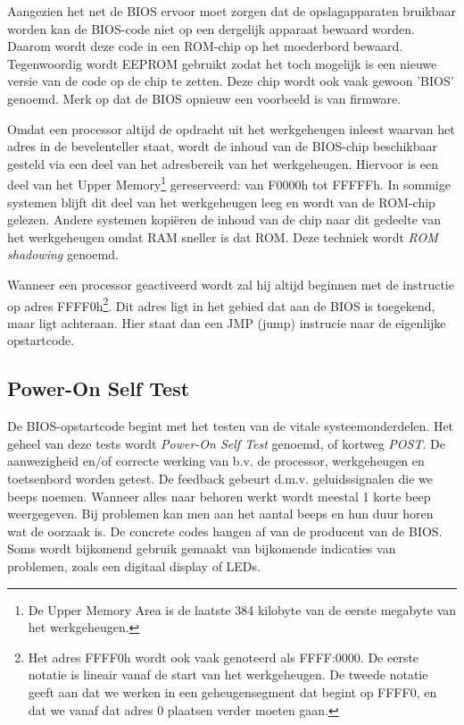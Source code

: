 Aangezien het net de BIOS ervoor moet zorgen dat de
opslagapparaten bruikbaar worden kan de BIOS-code niet op een dergelijk
apparaat bewaard worden. Daarom wordt deze code in een ROM-chip op het
moederbord bewaard. Tegenwoordig wordt EEPROM gebruikt zodat het toch
mogelijk is een nieuwe versie van de code op de chip te zetten. Deze
chip wordt ook vaak gewoon 'BIOS' genoemd. Merk op dat de BIOS opnieuw
een voorbeeld is van firmware.

Omdat een processor altijd de opdracht uit het werkgeheugen
inleest waarvan het adres in de bevelenteller staat, wordt de inhoud van
de BIOS-chip beschikbaar gesteld via een deel van het adresbereik van
het werkgeheugen. Hiervoor is een deel van het Upper Memory\footnote{De Upper
Memory Area is de laatste 384 kilobyte van de eerste megabyte van het
werkgeheugen.} gereserveerd: van F0000h tot FFFFFh. In sommige systemen
blijft dit deel van het werkgeheugen leeg en wordt van de ROM-chip
gelezen. Andere systemen kopi\"eren de inhoud van de chip naar dit
gedeelte van het werkgeheugen omdat RAM sneller is dat ROM. Deze
techniek wordt \emph{ROM shadowing} genoemd.

Wanneer een processor geactiveerd wordt zal hij altijd beginnen
met de instructie op adres FFFF0h\footnote{Het adres FFFF0h wordt ook vaak
genoteerd als FFFF:0000. De eerste notatie is lineair vanaf de start van het
werkgeheugen. De tweede notatie geeft aan dat we werken in een geheugensegment
dat begint op FFFF0, en dat we vanaf dat adres 0 plaatsen verder moeten gaan.}.
Dit adres ligt in het gebied dat aan de BIOS is toegekend, maar ligt achteraan.
Hier staat dan een JMP (jump) instrucie naar de eigenlijke opstartcode.

\subsection{Power-On Self Test}

De BIOS-opstartcode begint met het testen van de vitale
systeemonderdelen. Het geheel van deze tests wordt \emph{Power-On
Self Test} genoemd, of kortweg \emph{POST}.
De aanwezigheid en/of correcte werking van b.v. de processor,
werkgeheugen en toetsenbord worden getest. De feedback gebeurt d.m.v.
geluidssignalen die we beeps noemen. Wanneer alles naar behoren werkt
wordt meestal 1 korte beep weergegeven. Bij problemen kan men aan het
aantal beeps en hun duur horen wat de oorzaak is. De concrete codes
hangen af van de producent van de BIOS. Soms wordt bijkomend gebruik
gemaakt van bijkomende indicaties van problemen, zoals een digitaal
display of LEDs.
